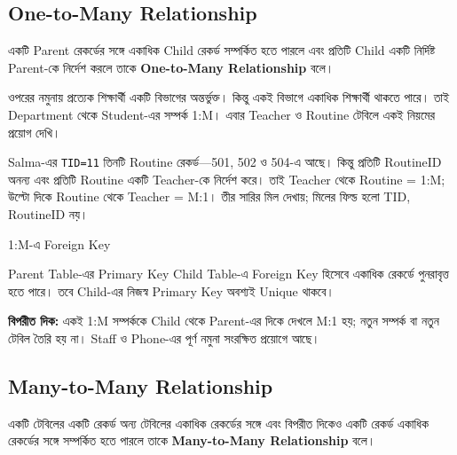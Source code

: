 \subsection{One-to-Many Relationship}

\begin{definitionbox}{}

একটি Parent রেকর্ডের সঙ্গে একাধিক Child রেকর্ড সম্পর্কিত হতে
পারলে এবং প্রতিটি Child একটি নির্দিষ্ট Parent-কে নির্দেশ করলে
তাকে \textbf{One-to-Many Relationship} বলে।

\end{definitionbox}


ওপরের নমুনায় প্রত্যেক শিক্ষার্থী একটি বিভাগের অন্তর্ভুক্ত। কিন্তু একই বিভাগে একাধিক শিক্ষার্থী থাকতে পারে। তাই Department থেকে Student-এর সম্পর্ক 1:M। এবার Teacher ও Routine টেবিলে একই নিয়মের প্রয়োগ দেখি।



Salma-এর \texttt{TID=11} তিনটি Routine রেকর্ড—501, 502 ও 504-এ
আছে। কিন্তু প্রতিটি RoutineID অনন্য এবং প্রতিটি Routine একটি Teacher-কে
নির্দেশ করে। তাই Teacher থেকে Routine = 1:M; উল্টো দিকে Routine থেকে
Teacher = M:1। তীর সারির মিল দেখায়; মিলের ফিল্ড হলো TID, RoutineID নয়।

\begin{keypointbox}{1:M-এ Foreign Key}

Parent Table-এর Primary Key Child Table-এ Foreign Key হিসেবে
একাধিক রেকর্ডে পুনরাবৃত্ত হতে পারে। তবে Child-এর নিজস্ব Primary Key অবশ্যই Unique থাকবে।

\end{keypointbox}



\textbf{বিপরীত দিক:} একই 1:M সম্পর্ককে Child থেকে Parent-এর দিকে দেখলে M:1 হয়; নতুন সম্পর্ক বা নতুন টেবিল তৈরি হয় না। Staff ও Phone-এর পূর্ণ নমুনা সংরক্ষিত প্রয়োগে আছে।

\subsection{Many-to-Many Relationship}

\begin{definitionbox}{}

একটি টেবিলের একটি রেকর্ড অন্য টেবিলের একাধিক রেকর্ডের সঙ্গে
এবং বিপরীত দিকেও একটি রেকর্ড একাধিক রেকর্ডের সঙ্গে সম্পর্কিত হতে
পারলে তাকে \textbf{Many-to-Many Relationship} বলে।

\end{definitionbox}


